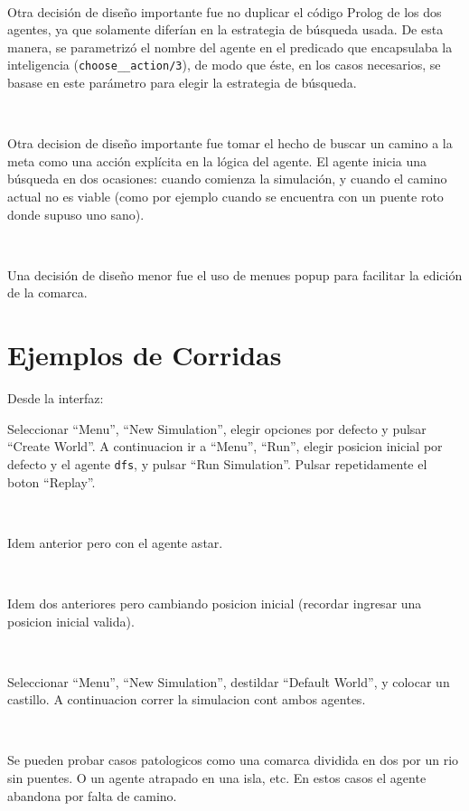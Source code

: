 \documentclass[a4paper,12pt]{report}
\begin{document}
\

Otra decisi\'{o}n de dise\~{n}o importante fue no duplicar el c\'{o}digo Prolog de los dos agentes, ya que solamente
difer\'{i}an en la estrategia de b\'{u}squeda usada.
De esta manera, se parametriz\'{o} el nombre del agente en el predicado que encapsulaba la inteligencia
(\texttt{choose\_\_action/3}), de modo que \'{e}ste, en los casos necesarios, se basase en este par\'{a}metro para elegir
la estrategia de b\'{u}squeda.

\

Otra decision de dise\~{n}o importante fue tomar el hecho de buscar un camino a la meta como una acci\'{o}n expl\'{i}cita
en la l\'{o}gica del agente.
El agente inicia una b\'{u}squeda en dos ocasiones: cuando comienza la simulaci\'{o}n, y cuando el camino actual no es
viable (como por ejemplo cuando se encuentra con un puente roto donde supuso uno sano).

\

Una decisi\'{o}n de dise\~{n}o menor fue el uso de menues popup para facilitar la edici\'{o}n de la comarca.

\chapter{Ejemplos de Corridas}

Desde la interfaz:

Seleccionar ``Menu'', ``New Simulation'', elegir opciones por defecto y pulsar ``Create World''.
A continuacion ir a ``Menu'', ``Run'', elegir posicion inicial por defecto y el agente \texttt{dfs},
y pulsar ``Run Simulation''. Pulsar repetidamente el boton ``Replay''.

\

Idem anterior pero con el agente astar.

\

Idem dos anteriores pero cambiando posicion inicial (recordar ingresar una posicion inicial valida).

\

Seleccionar ``Menu'', ``New Simulation'', destildar ``Default World'', y colocar un castillo. A continuacion correr la
simulacion cont ambos agentes.

\

Se pueden probar casos patologicos como una comarca dividida en dos por un rio sin puentes. O un agente atrapado en una
isla, etc. En estos casos el agente abandona por falta de camino.

\
\end{document}
